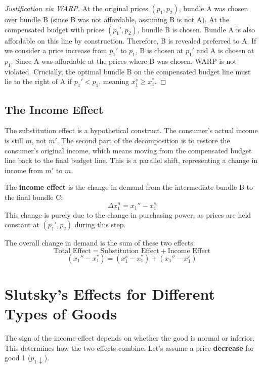 \begin{proof}[Justification via WARP]
At the original prices \((p_1, p_2)\), bundle A was chosen over bundle B (since B was not affordable, assuming B is not A). At the compensated budget with prices \((p_1', p_2)\), bundle B is chosen. Bundle A is also affordable on this line by construction. Therefore, B is revealed preferred to A. If we consider a price increase from \(p_1'\) to \(p_1\), B is chosen at \(p_1'\) and A is chosen at \(p_1\). Since A was affordable at the prices where B was chosen, WARP is not violated. Crucially, the optimal bundle B on the compensated budget line must lie to the right of A if \(p_1' < p_1\), meaning \(x_1^s \ge x_1^*\).
\end{proof}

\subsection{The Income Effect}
The substitution effect is a hypothetical construct. The consumer's actual income is still \(m\), not \(m'\). The second part of the decomposition is to restore the consumer's original income, which means moving from the compensated budget line back to the final budget line. This is a parallel shift, representing a change in income from \(m'\) to \(m\).

The \textbf{income effect} is the change in demand from the intermediate bundle B to the final bundle C:
\[
\Delta x_1^n = x_1'' - x_1^s
\]
This change is purely due to the change in purchasing power, as prices are held constant at \((p_1', p_2)\) during this step.

The overall change in demand is the sum of these two effects:
\[
\text{Total Effect} = \text{Substitution Effect} + \text{Income Effect}
\]
\[
(x_1'' - x_1^*) = (x_1^s - x_1^*) + (x_1'' - x_1^s)
\]

\section{Slutsky's Effects for Different Types of Goods}

The sign of the income effect depends on whether the good is normal or inferior. This determines how the two effects combine. Let's assume a price \textbf{decrease} for good 1 (\(p_1 \downarrow\)).

